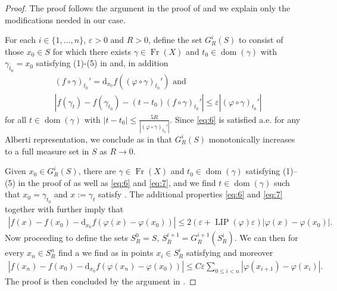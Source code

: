\documentclass{amsart}
\numberwithin{equation}{section}
\newcommand{\LIP}{\operatorname{LIP}}
\newcommand{\dom}{\operatorname{dom}}
\newcommand{\Fr}{\operatorname{Fr}}
\newcommand{\ud}{\mathrm {d}}
\begin{document}
\begin{proof}
    The proof follows the argument in the proof of \cite[Lemma 9.1]{bate15} and we explain only the modifications needed in our case. 

For each $i\in \{1,\ldots,n\}$, $\varepsilon>0$ and $R>0$, define the set $G^i_R(S)$ to consist of those $x_0\in S$ for which there exists $\gamma\in \Fr(X)$ and $t_0\in \dom(\gamma)$ with $\gamma_{t_0}=x_0$ satisfying (1)-(5) in \cite[Lemma 9.1]{bate15}  and, in addition
\begin{align}
    &(f\circ\gamma)_{t_0}'=\ud_{x_0}f((\varphi\circ\gamma)_{t_0}')\textrm{ and }\label{eq:6}\\
    &|f(\gamma_t)-f(\gamma_{t_0})-(t-t_0)(f\circ\gamma)_{t_0}'|\le \varepsilon|(\varphi\circ\gamma)_{t_0}'|\label{eq:7}
\end{align}
for all $t\in \dom(\gamma)$ with $|t-t_0|\le \frac{5R}{|(\varphi\circ\gamma)_{t_0}'|}$. Since \eqref{eq:6} is satisfied a.e. for any Alberti representation, we conclude as in \cite{bate15} that $G^i_R(S)$ monotonically increases to a full measure set in $S$ as $R\to 0$.

Given $x_0\in G^i_R(S)$, there are $\gamma\in \Fr(X)$ and $t_0\in \dom(\gamma)$ satisfying (1)--(5) in the proof of \cite[Lemma 9.1]{bate15} as well as \eqref{eq:6} and \eqref{eq:7}, and we find $t\in \dom(\gamma)$ such that $x_0=\gamma_{t_0}$ and $x:= \gamma_t$ satisfy \cite[(9.4) and (9.5), p. 472]{bate15}. The additional properties \eqref{eq:6} and \eqref{eq:7} together with \cite[(2), p. 472]{bate15} further imply that
\begin{align}\label{eq:ast}
|f(x)-f(x_0)-\ud_{x_0}f(\varphi(x)-\varphi(x_0))|\le 2(\varepsilon+\LIP(\varphi)\varepsilon)|\varphi(x)-\varphi(x_0)|.
\end{align}
Now proceeding to define the sets $S_R^0=S$, $S_R^{i+1}=G_R^{i+1}(S_R^i)$. We can then for every $x_n\in S^n_{R}$ find a we find as in \cite{bate15} points $x_i\in S^i_R$ satisfying \cite[(9.6) and (9.8)]{bate15} and moreover
\begin{align}
|f(x_n)-f(x_0)- \ud_{x_0}f(\varphi(x_n)-\varphi(x_0))|\le C\varepsilon\sum_{0\le i<n}|\varphi(x_{i+1})-\varphi(x_i)|.
\end{align}
The proof is then concluded by the argument in \cite{bate15}.
\end{proof}
\end{document}
